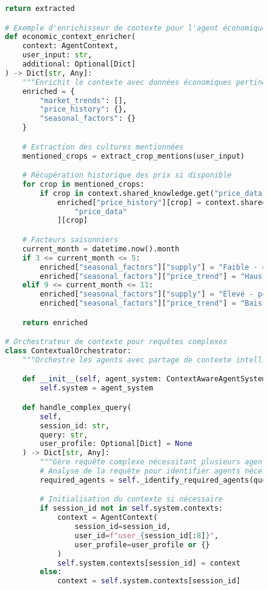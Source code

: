 \begin{figure}[H]
\begin{lstlisting}[language=Python, caption=Système de gestion du contexte inter-agents]
        return extracted

# Exemple d'enrichisseur de contexte pour l'agent économique
def economic_context_enricher(
    context: AgentContext,
    user_input: str,
    additional: Optional[Dict]
) -> Dict[str, Any]:
    """Enrichit le contexte avec données économiques pertinentes."""
    enriched = {
        "market_trends": [],
        "price_history": {},
        "seasonal_factors": {}
    }

    # Extraction des cultures mentionnées
    mentioned_crops = extract_crop_mentions(user_input)

    # Récupération historique des prix si disponible
    for crop in mentioned_crops:
        if crop in context.shared_knowledge.get("price_data", {}):
            enriched["price_history"][crop] = context.shared_knowledge[
                "price_data"
            ][crop]

    # Facteurs saisonniers
    current_month = datetime.now().month
    if 3 <= current_month <= 5:
        enriched["seasonal_factors"]["supply"] = "Faible - début saison"
        enriched["seasonal_factors"]["price_trend"] = "Haussier"
    elif 9 <= current_month <= 11:
        enriched["seasonal_factors"]["supply"] = "Élevé - période récolte"
        enriched["seasonal_factors"]["price_trend"] = "Baissier"

    return enriched

# Orchestrateur de contexte pour requêtes complexes
class ContextualOrchestrator:
    """Orchestre les agents avec partage de contexte intelligent."""

    def __init__(self, agent_system: ContextAwareAgentSystem):
        self.system = agent_system

    def handle_complex_query(
        self,
        session_id: str,
        query: str,
        user_profile: Optional[Dict] = None
    ) -> Dict[str, Any]:
        """Gère requête complexe nécessitant plusieurs agents."""
        # Analyse de la requête pour identifier agents nécessaires
        required_agents = self._identify_required_agents(query)

        # Initialisation du contexte si nécessaire
        if session_id not in self.system.contexts:
            context = AgentContext(
                session_id=session_id,
                user_id=f"user_{session_id[:8]}",
                user_profile=user_profile or {}
            )
            self.system.contexts[session_id] = context
        else:
            context = self.system.contexts[session_id]


\end{lstlisting}
\end{figure}
